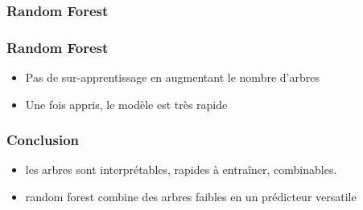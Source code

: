 \documentclass{formation}
\begin{document}
\begin{frame}
  \frametitle{Random Forest}
\end{frame}

\begin{frame}
  \frametitle{Random Forest}
  \begin{itemize}
  \item Pas de sur-apprentissage en augmentant le nombre d'arbres
  \item Une fois appris, le modèle est très rapide
  \end{itemize}
\end{frame}

\begin{frame}
  \frametitle{Conclusion}
  \begin{itemize}
  \item les arbres sont interprétables, rapides à entraîner,
    combinables.
  \item random forest combine des arbres faibles en un prédicteur
    versatile
  \end{itemize}
\end{frame}
\end{document}
